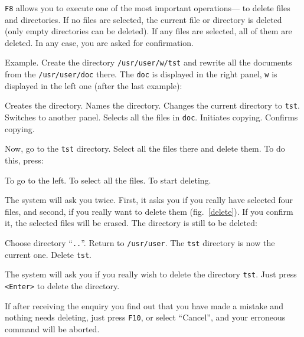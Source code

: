 {\tt F8} allows you to execute one of the most important
operations--- to delete files and directories. If no files are
selected, the current file or directory is deleted (only 
empty directories can be deleted). If any files are 
selected, all of them are deleted. In any case, you are 
asked for confirmation. 

Example. Create the directory {\tt /usr/user/w/tst} and
rewrite all the documents from the {\tt /usr/user/doc} there.
The {\tt doc} is displayed in the right panel,
{\tt w} is displayed in the left one (after the last example):

\begin{example}
Creates the directory.
Names the directory.
Changes the current directory to {\tt tst}.
Switches to another panel.
Selects all the files in {\tt doc}.
Initiates copying.
Confirms copying.
\end{example}

Now, go to the {\tt tst} directory. Select all the files there and
delete them. To do this, press: 

\begin{example}
To go to the left.
To select all the files.
To start deleting.
\end{example}


The system will ask you twice. First, it asks you if you really have
selected four files, and second, if you really want to delete
them (fig.~\ref{delete}). If you confirm it, the selected files will be
erased. The directory is still to be deleted:

\begin{example}
Choose directory ``{\tt ..}''.
Return to {\tt /usr/user}. The {\tt tst} directory is now the current one.
Delete {\tt tst}.
\end{example}

The system will ask you if you really wish to delete the
directory {\tt tst}. Just press {\tt <Enter>} to delete the directory.

If after receiving the enquiry you find out that you have 
made a mistake and nothing needs deleting, just press {\tt F10}, or
select ``Cancel'', and your erroneous command will be aborted.

